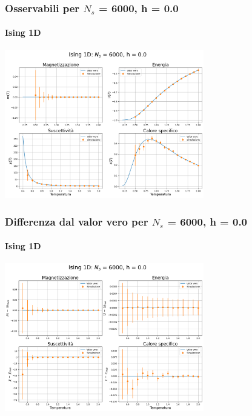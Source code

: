 \begin{frame}
    \frametitle{Osservabili per $N_s$ = 6000, h = 0.0}
    \framesubtitle{Ising 1D}

    \centering
    \includegraphics[width=0.65\textwidth]{Immagini/backupIsing1D/obs_6000_0.0.png}

\end{frame}



\begin{frame}
    \frametitle{Differenza dal valor vero per $N_s$ = 6000, h = 0.0}
    \framesubtitle{Ising 1D}

    \centering
    \includegraphics[width=0.65\textwidth]{Immagini/backupIsing1D/obs_6000_0.0_diff.png}

\end{frame}



